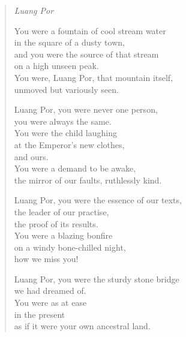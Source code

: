 
\thispagestyle{empty}

\begin{verse}
\emph{Luang Por}

You were a fountain of cool stream water\\
in the square of a dusty town,\\
and you were the source of that stream\\
on a high unseen peak.\\
You were, Luang Por, that mountain itself,\\
unmoved but variously seen.

Luang Por, you were never one person,\\
you were always the same.\\
You were the child laughing\\
at the Emperor's new clothes,\\
and ours.\\
You were a demand to be awake,\\
the mirror of our faults, ruthlessly kind.

Luang Por, you were the essence of our texts,\\
the leader of our practise,\\
the proof of its results.\\
You were a blazing bonfire\\
on a windy bone-chilled night,\\
how we miss you!

Luang Por, you were the sturdy stone bridge\\
we had dreamed of.\\
You were as at ease\\
in the present\\
as if it were your own ancestral land.

\end{verse}

\clearpage
\thispagestyle{empty}


